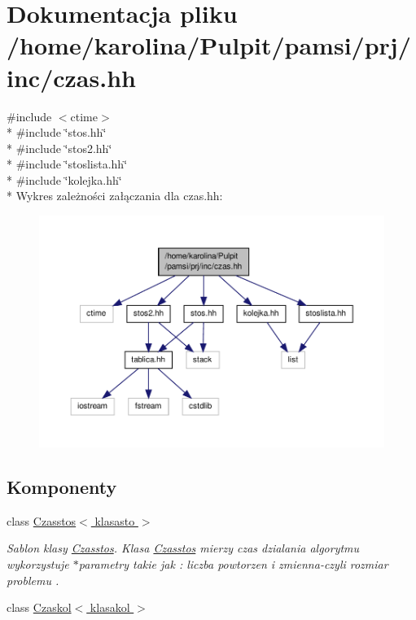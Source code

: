 \hypertarget{czas_8hh}{\section{Dokumentacja pliku /home/karolina/\-Pulpit/pamsi/prj/inc/czas.hh}
\label{czas_8hh}
}
{\ttfamily \#include $<$ctime$>$}\\*
{\ttfamily \#include \char`\"{}stos.\-hh\char`\"{}}\\*
{\ttfamily \#include \char`\"{}stos2.\-hh\char`\"{}}\\*
{\ttfamily \#include \char`\"{}stoslista.\-hh\char`\"{}}\\*
{\ttfamily \#include \char`\"{}kolejka.\-hh\char`\"{}}\\*
Wykres zależności załączania dla czas.\-hh\-:
\nopagebreak
\begin{figure}[H]
\begin{center}
\leavevmode
\includegraphics[width=350pt]{czas_8hh__incl}
\end{center}
\end{figure}
\subsection*{Komponenty}
\begin{DoxyCompactItemize}
\item 
class \hyperlink{class_czasstos}{Czasstos$<$ klasasto $>$}
\begin{DoxyCompactList}\small\item\em Sablon klasy \hyperlink{class_czasstos}{Czasstos}. Klasa \hyperlink{class_czasstos}{Czasstos} mierzy czas dzialania algorytmu wykorzystuje $\ast$parametry takie jak \-: liczba powtorzen i zmienna-\/czyli rozmiar problemu . \end{DoxyCompactList}\item 
class \hyperlink{class_czaskol}{Czaskol$<$ klasakol $>$}
\end{DoxyCompactItemize}

